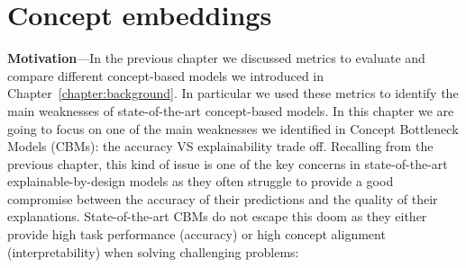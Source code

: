 \chapter{Concept embeddings} \label{chapter:cem}


\textbf{Motivation}---In the previous chapter we discussed metrics to evaluate and compare different concept-based models we introduced in Chapter~\ref{chapter:background}. In particular we used these metrics to identify the main weaknesses of state-of-the-art concept-based models. In this chapter we are going to focus on one of the main weaknesses we identified in Concept Bottleneck Models (CBMs): the accuracy VS explainability trade off. Recalling from the previous chapter, this kind of issue is one of the key concerns in state-of-the-art explainable-by-design models as they often struggle to provide a good compromise between the accuracy of their predictions and the quality of their explanations. State-of-the-art CBMs do not escape this doom as they either provide high task performance (accuracy) or high concept alignment (interpretability) when solving challenging problems:

